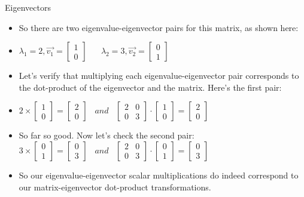   \begin{frame}[fragile]{Eigenvectors}
\begin{itemize}

\item So there are two eigenvalue-eigenvector pairs for this matrix, as shown here:
\item $\lambda_{1} = 2, \vec{v_{1}} = \begin{bmatrix}1 \\ 0\end{bmatrix}  \;\;\;\;\;\; \lambda_{2} = 3, \vec{v_{2}} = \begin{bmatrix}0 \\ 1\end{bmatrix}$
\item Let's verify that multiplying each eigenvalue-eigenvector pair corresponds to the dot-product of the eigenvector and the matrix. Here's the first pair:
\item $2 \times \begin{bmatrix}1 \\ 0\end{bmatrix} = \begin{bmatrix}2 \\ 0\end{bmatrix}  \;\;\;and\;\;\; \begin{bmatrix}2 & 0\\0 & 3\end{bmatrix} \cdot \begin{bmatrix}1 \\ 0\end{bmatrix} = \begin{bmatrix}2 \\ 0\end{bmatrix}$
\item So far so good. Now let's check the second pair: $3 \times \begin{bmatrix}0 \\ 1\end{bmatrix} = \begin{bmatrix}0 \\ 3\end{bmatrix}  \;\;\;and\;\;\; \begin{bmatrix}2 & 0\\0 & 3\end{bmatrix} \cdot \begin{bmatrix}0 \\ 1\end{bmatrix} = \begin{bmatrix}0 \\ 3\end{bmatrix}$
\item So our eigenvalue-eigenvector scalar multiplications do indeed correspond to our matrix-eigenvector dot-product transformations.
\end{itemize}

\end{frame}






